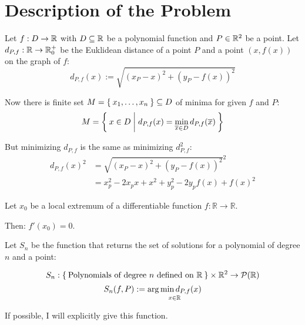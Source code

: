 \chapter{Description of the Problem}
Let $f: D \rightarrow \mathbb{R}$ with $D \subseteq \mathbb{R}$ be a polynomial function and $P \in \mathbb{R}^2$
be a point. Let $d_{P,f}: \mathbb{R} \rightarrow \mathbb{R}_0^+$
be the Euklidean distance of a point $P$ and a point $\left (x, f(x) \right )$
on the graph of $f$:
\[d_{P,f} (x) := \sqrt{(x_P - x)^2 + (y_P - f(x))^2}\]

Now there is finite set $M = \Set{x_1, \dots, x_n} \subseteq D$ of minima for given $f$ and $P$:
\[M = \Set{x \in D | d_{P,f}(x) = \min_{\overline{x} \in D} d_{P,f}(\overline{x})}\] 

But minimizing $d_{P,f}$ is the same as minimizing $d_{P,f}^2$:
\begin{align}
    d_{P,f}(x)^2    &= \sqrt{(x_P - x)^2 + (y_P - f(x))^2}^2\\
                &= x_p^2 - 2x_p x + x^2 + y_p^2 - 2y_p f(x) + f(x)^2
\end{align}

\begin{theorem}\label{thm:required-extremum-property}
    Let $x_0$ be a local extremum of a differentiable function $f: \mathbb{R} \rightarrow \mathbb{R}$.

    Then: $f'(x_0) = 0$.
\end{theorem}

Let $S_n$ be the function that returns the set of solutions for a
polynomial of degree $n$ and a point:

\[S_n: \Set{\text{Polynomials of degree } n \text{ defined on } \ensuremath{\mathbb{R}}} \times \mathbb{R}^2 \rightarrow \mathcal{P}({\mathbb{R}})\]
\[S_n(f, P) := \underset{x\in\mathbb{R}}{\arg \min d_{P,f}(x)}\]

If possible, I will explicitly give this function.
